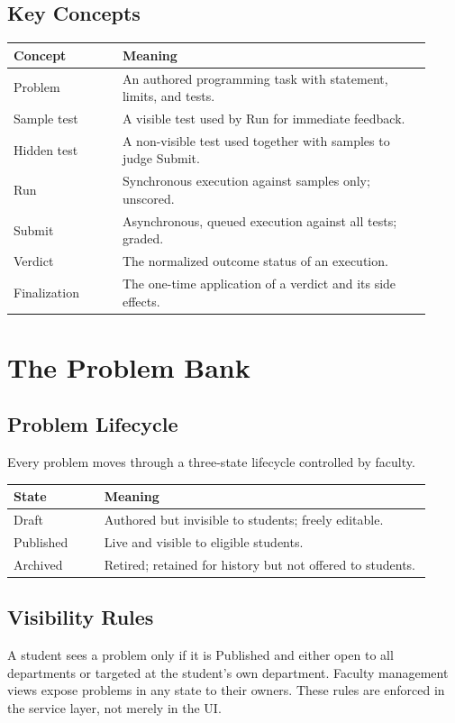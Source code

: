 \documentclass[12pt,a4paper,oneside]{report}
\begin{document}
\section{Key Concepts}
\begin{longtable}{@{}p{0.24\linewidth} p{0.68\linewidth}@{}}
\toprule
\textbf{Concept} & \textbf{Meaning}\\
\midrule
\endhead
Problem & An authored programming task with statement, limits, and tests.\\
Sample test & A visible test used by Run for immediate feedback.\\
Hidden test & A non-visible test used together with samples to judge Submit.\\
Run & Synchronous execution against samples only; unscored.\\
Submit & Asynchronous, queued execution against all tests; graded.\\
Verdict & The normalized outcome status of an execution.\\
Finalization & The one-time application of a verdict and its side effects.\\
\bottomrule
\end{longtable}

\chapter{The Problem Bank}
\section{Problem Lifecycle}
Every problem moves through a three-state lifecycle controlled by faculty.
\begin{longtable}{@{}p{0.20\linewidth} p{0.72\linewidth}@{}}
\toprule
\textbf{State} & \textbf{Meaning}\\
\midrule
\endhead
Draft & Authored but invisible to students; freely editable.\\
Published & Live and visible to eligible students.\\
Archived & Retired; retained for history but not offered to students.\\
\bottomrule
\end{longtable}

\section{Visibility Rules}
A student sees a problem only if it is Published and either open to all
departments or targeted at the student's own department. Faculty management views
expose problems in any state to their owners. These rules are enforced in the
service layer, not merely in the UI.
\end{document}
